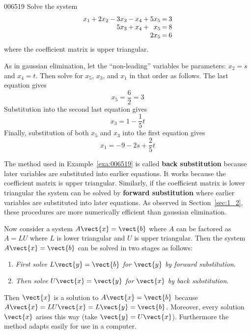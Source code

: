 \begin{example}{}{006519}
Solve the system
\begin{equation*}
\arraycolsep=1pt
\begin{array}{rrrrrrrrrrr}
x_{1} & + & 2x_{2} & - & 3x_{3} & - & x_{4} & + & 5x_{5} & = & 3 \\
 & & & & 5x_{3} & + & x_{4} & + & x_{5} & = & 8 \\
 & & & & & & & & 2x_{5} & = & 6 \\
\end{array}
\end{equation*}
where the coefficient matrix is upper triangular.

\begin{solution}
  As in gaussian elimination, let the ``non-leading'' variables be parameters: $x_{2} = s$ and $x_{4} = t$. Then solve for $x_{5}$, $x_{3}$, and $x_{1}$ in that order as follows. The last equation gives
\begin{equation*}
x_{5} = \frac{6}{2} = 3
\end{equation*}
Substitution into the second last equation gives
\begin{equation*}
x_{3} = 1 - \frac{1}{5}t
\end{equation*}
Finally, substitution of both $x_{5}$ and $x_{3}$ into the first equation gives
\begin{equation*}
x_{1} = -9 -2s + \frac{2}{5}t
\end{equation*}
\end{solution}
\end{example}

The method used in Example~\ref{exa:006519} is called \textbf{back substitution} because later variables are substituted into earlier equations. It works because the coefficient matrix is upper triangular. Similarly, if the coefficient matrix is lower triangular the system can be solved by \textbf{forward substitution} where earlier variables are substituted into later equations. As observed in Section~\ref{sec:1_2}, these procedures are more numerically efficient than gaussian elimination.

Now consider a system $A\vect{x} = \vect{b}$ where $A$ can be factored as $A = LU$ where $L$ is lower triangular and $U$ is upper triangular. Then the system $A\vect{x} = \vect{b}$ can be solved in two stages as follows:

\begin{enumerate}
\item \textit{First solve} $L\vect{y} = \vect{b}$ \textit{for} $\vect{y}$ \textit{by forward substitution}.

\item \textit{Then solve} $U\vect{x} = \vect{y}$ \textit{for} $\vect{x}$ \textit{by back substitution}.

\end{enumerate}
Then $\vect{x}$ is a solution to $A\vect{x} = \vect{b}$ because $A\vect{x} = LU\vect{x} = L\vect{y} = \vect{b}$. Moreover, every solution $\vect{x}$ arises this way (take $\vect{y} = U\vect{x}$). Furthermore the method adapts easily for use in a computer.

